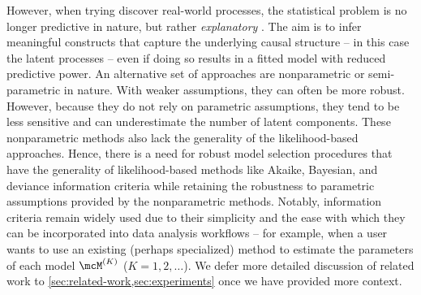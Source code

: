 However, when trying discover real-world processes, the statistical problem is no longer predictive in nature, but rather \emph{explanatory}  \citep{Shmueli:2010}.
The aim is to infer meaningful constructs that capture the underlying causal structure 
-- in this case the latent processes -- even if doing so results in a fitted model with reduced
predictive power.
An alternative set of approaches are nonparametric or semi-parametric in nature. 
With weaker assumptions, they can often be more robust.
However, because they do not rely on parametric assumptions, they tend to be less sensitive and can underestimate the number of latent components. 
These nonparametric methods also lack the generality of the likelihood-based approaches. 
Hence, there is a need for robust model selection procedures that have the generality of likelihood-based methods like Akaike, Bayesian, and deviance information criteria \citep{Akaike:1974,Schwarz:1978,Spiegelhalter:2002} while
retaining the robustness to parametric assumptions provided by the nonparametric methods. 
Notably, information criteria remain widely used due to their simplicity and the ease with
which they can be incorporated into data analysis workflows -- for example, when a user wants to use an existing (perhaps specialized) method to estimate the parameters of each model $\model{K}$ ($K = 1, 2, \dots$).
We defer more detailed discussion of related work to \cref{sec:related-work,sec:experiments} once we have provided more context. 
%

